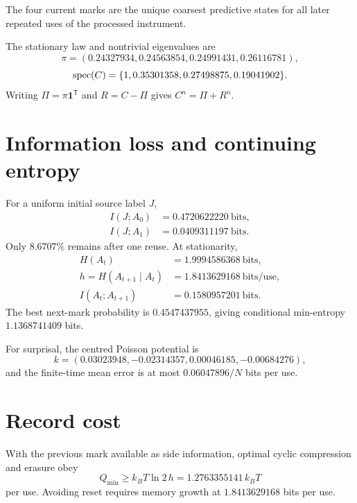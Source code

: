 \documentclass[11pt,a4paper]{article}
\begin{document}
\begin{theorem}
The four current marks are the unique coarsest predictive states for all later repeated uses of the processed instrument.
\end{theorem}

The stationary law and nontrivial eigenvalues are
\begin{equation}
\pi=(0.24327934,0.24563854,0.24991431,0.26116781),
\end{equation}
\begin{equation}
\operatorname{spec}(C)=\{1,0.35301358,0.27498875,0.19041902\}.
\end{equation}
Writing $\Pi=\pi\mathbf1^{\mathsf T}$ and $R=C-\Pi$ gives $C^n=\Pi+R^n$.

\section{Information loss and continuing entropy}
For a uniform initial source label $J$,
\begin{align}
I(J;A_0)&=0.4720622220\ \text{bits},\\
I(J;A_1)&=0.0409311197\ \text{bits}.
\end{align}
Only $8.6707\%$ remains after one reuse. At stationarity,
\begin{align}
H(A_t)&=1.9994586368\ \text{bits},\\
h=H(A_{t+1}\mid A_t)&=1.8413629168\ \text{bits/use},\\
I(A_t;A_{t+1})&=0.1580957201\ \text{bits}.
\end{align}
The best next-mark probability is $0.4547437955$, giving conditional min-entropy $1.1368741409$ bits.

For surprisal, the centred Poisson potential is
\begin{equation}
k=(0.03023948,-0.02314357,0.00046185,-0.00684276),
\end{equation}
and the finite-time mean error is at most $0.06047896/N$ bits per use.

\section{Record cost}
With the previous mark available as side information, optimal cyclic compression and erasure obey
\begin{equation}
Q_{\min}\ge k_BT\ln2\,h=1.2763355141\,k_BT
\end{equation}
per use. Avoiding reset requires memory growth at $1.8413629168$ bits per use.
\end{document}

